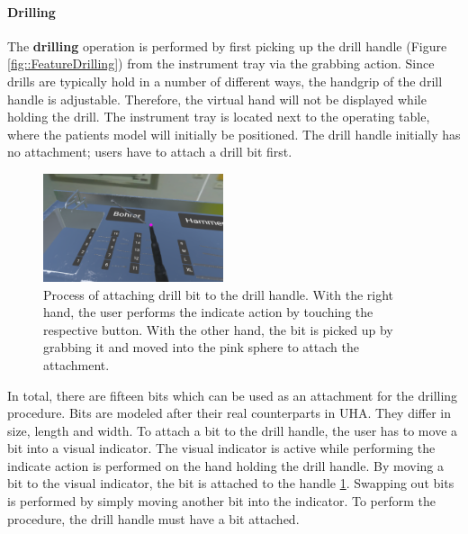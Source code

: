 \paragraph{Drilling}

The \textbf{drilling} operation is performed by first picking up the drill handle (Figure \ref{fig::FeatureDrilling}) from the instrument tray via the grabbing action.
Since drills are typically hold in a number of different ways, the handgrip of the drill handle is adjustable.
Therefore, the virtual hand will not be displayed while holding the drill.
The instrument tray is located next to the operating table, where the patients model will initially be positioned.
The drill handle initially has no attachment; users have to attach a drill bit first.

\begin{figure}[ht]
    \centering
    \includegraphics[width=200px]{images/implementation/features/procedures/drilling_attachment.png}
    \caption{\label{fig::FeatureDrillingAttachments}Process of attaching drill bit to the drill handle. With the right hand, the user performs the indicate action by touching the respective button. With the other hand, the bit is picked up by grabbing it and moved into the pink sphere to attach the attachment.}
\end{figure}

In total, there are fifteen bits which can be used as an attachment for the drilling procedure.
Bits are modeled after their real counterparts in UHA.
They differ in size, length and width.
To attach a bit to the drill handle, the user has to move a bit into a visual indicator.
The visual indicator is active while performing the indicate action is performed on the hand holding the drill handle.
By moving a bit to the visual indicator, the bit is attached to the handle \ref{fig::FeatureDrillingAttachments}.
Swapping out bits is performed by simply moving another bit into the indicator.
To perform the procedure, the drill handle must have a bit attached. 

